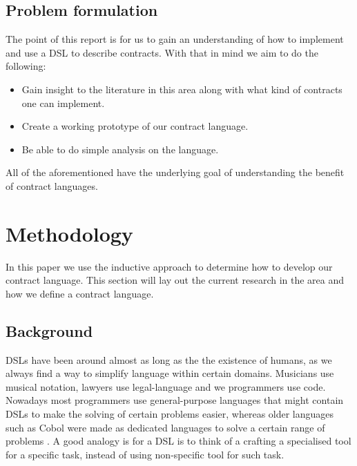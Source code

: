 \documentclass{ituthesis}
\begin{document}
\section{Problem formulation}
The point of this report is for us to gain an understanding of how to implement and use a DSL to describe contracts. With that in mind we aim to do the following:

\begin{itemize}
    \item Gain insight to the literature in this area along with what kind of contracts one can implement.
    \item Create a working prototype of our contract language.
    \item Be able to do simple analysis on the language.
\end{itemize}

All of the aforementioned have the underlying goal of understanding the benefit of contract languages.


\chapter{Methodology}


In this paper we use the inductive approach to determine how to develop our contract language. This section will lay out the current research in the area and how we define a contract language.

\section{Background}
DSLs have been around almost as long as the the existence of humans, as we always find a way to simplify language within certain domains. Musicians use musical notation, lawyers use legal-language and we programmers use code. Nowadays most programmers use general-purpose languages that might contain DSLs to make the solving of certain problems easier, whereas older languages such as Cobol were made as dedicated languages to solve a certain range of problems \cite{van2000domain}. A good analogy is for a DSL is to think of a crafting a specialised tool for a specific task, instead of using non-specific tool for such task.
\end{document}
